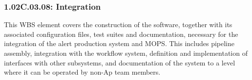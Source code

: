 \subsubsection*{1.02C.03.08: Integration}

This WBS element covers the construction of the software, together with
its associated configuration files, test suites and documentation, necessary
for the integration of the alert production system and MOPS.  This includes
pipeline assembly, integration with the workflow system, definition and
implementation of interfaces with other subsystems, and documentation
of the system to a level where it can be operated by non-Ap team members.
